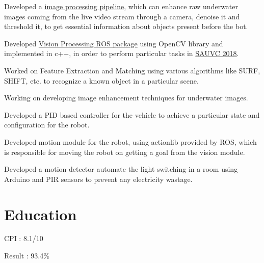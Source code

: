 \documentclass[]{deedy-resume-openfont}
\begin{document}
\begin{tightemize}
\item Developed a \href{https://github.com/ksakash/auv2017-1/blob/IP/task_handler_layer/ip.md}{image processing pipeline}, which can enhance raw underwater images coming from the live video stream through a camera, denoise it and threshold it, to get essential information about objects present before the bot. 
\item Developed \href{https://github.com/ksakash/IP_SAUVC/}{Vision Processing ROS package} using OpenCV library and implemented in c++, in order to perform particular tasks in \href{https://sauvc.org/}{SAUVC 2018}.  
\item Worked on Feature Extraction and Matching using various algorithms like SURF, SHIFT, etc. to recognize a known object in a particular scene.
\item Working on developing image enhancement techniques for underwater images.
\item Developed a PID based controller for the vehicle to achieve a particular state and configuration for the robot.
\item Developed motion module for the robot, using actionlib provided by ROS, which is responsible for moving the robot on getting a goal from the vision module.
\end{tightemize}
\sectionsep

\begin{tightemize}
\item Developed a motion detector automate the light switching in a room using Arduino and PIR sensors to prevent any electricity wastage.
\end{tightemize}

\sectionsep

\section{Education}

CPI : 8.1/10
\sectionsep

Result : 93.4\%
\sectionsep
\end{document}
